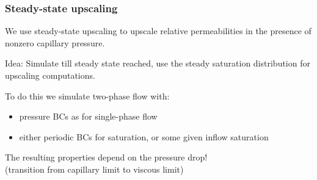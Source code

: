 \documentclass[UKenglish,10pt]{beamer}
\newcommand{\Code}[1]{\texttt{#1}}
\begin{document}
\begin{frame}
  \frametitle{Steady-state upscaling}

  We use steady-state upscaling to upscale relative permeabilities in
  the presence of nonzero capillary pressure.
  \bigskip

  Idea: Simulate till steady state reached, use the steady saturation
  distribution for upscaling computations.
  \bigskip

  To do this we simulate two-phase flow with:
  \begin{itemize}
  \item pressure BCs as for single-phase flow
  \item either periodic BCs for saturation, or some given inflow saturation
  \end{itemize}

  The resulting properties depend on the pressure drop! \\
  (transition from capillary limit to viscous limit)
\end{frame}







\end{document}
